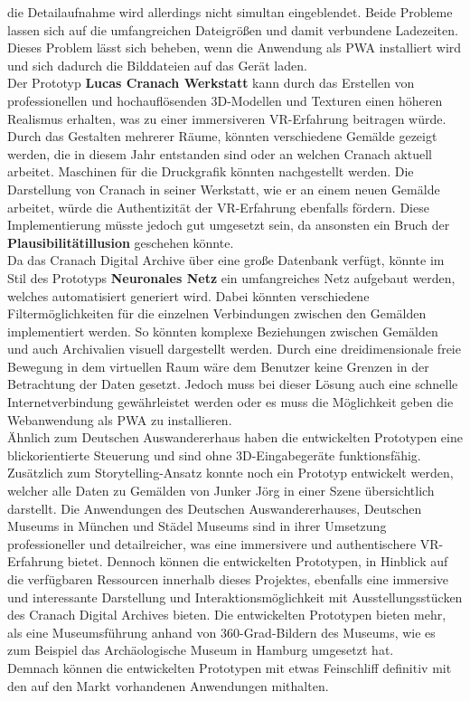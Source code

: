 \documentclass[a4paper,12pt,oneside]{article}
\begin{document}
    die Detailaufnahme wird allerdings nicht simultan eingeblendet.
    Beide Probleme lassen sich auf die umfangreichen Dateigrößen und damit
    verbundene Ladezeiten.
    Dieses Problem lässt sich beheben, wenn die Anwendung
    als PWA installiert wird und sich dadurch die Bilddateien auf das
    Gerät laden. \\
    Der Prototyp \textbf{Lucas Cranach Werkstatt} kann durch das Erstellen
    von professionellen und hochauflösenden 3D-Modellen und Texturen
    einen höheren Realismus erhalten, was zu einer immersiveren
    VR-Erfahrung beitragen würde. Durch das Gestalten mehrerer Räume,
    könnten verschiedene
    Gemälde gezeigt werden, die in diesem Jahr entstanden sind oder an
    welchen Cranach aktuell arbeitet. Maschinen für die Druckgrafik 
    könnten nachgestellt werden.
    Die Darstellung von Cranach in seiner Werkstatt, wie er an
    einem neuen Gemälde arbeitet, würde die Authentizität der VR-Erfahrung
    ebenfalls fördern. Diese Implementierung müsste jedoch gut umgesetzt sein,
    da ansonsten ein Bruch der \textbf{Plausibilitätillusion} geschehen könnte. \\
    Da das Cranach Digital Archive über eine große Datenbank verfügt,
    könnte im Stil des Prototyps \textbf{Neuronales Netz} ein 
    umfangreiches Netz aufgebaut werden, welches
    automatisiert generiert wird. Dabei könnten verschiedene 
    Filtermöglichkeiten für die einzelnen Verbindungen zwischen den 
    Gemälden implementiert werden. So könnten komplexe Beziehungen
    zwischen Gemälden und auch Archivalien visuell dargestellt werden.
    Durch eine dreidimensionale freie Bewegung in dem virtuellen Raum 
    wäre dem Benutzer keine Grenzen in der Betrachtung der Daten gesetzt.
    Jedoch muss bei dieser Lösung auch eine schnelle Internetverbindung
    gewährleistet werden oder es muss die Möglichkeit geben die Webanwendung
    als PWA zu installieren. \\
    Ähnlich zum Deutschen Auswandererhaus haben die entwickelten Prototypen 
    eine blickorientierte Steuerung und sind ohne 3D-Eingabegeräte funktionsfähig.
    Zusätzlich zum Storytelling-Ansatz konnte noch ein Prototyp entwickelt 
    werden, welcher alle Daten zu Gemälden von Junker Jörg in einer Szene 
    übersichtlich darstellt. Die Anwendungen des Deutschen Auswandererhauses,
    Deutschen Museums in München und Städel Museums sind in ihrer Umsetzung
    professioneller und detailreicher, was eine immersivere und authentischere
    VR-Erfahrung bietet. Dennoch können die entwickelten Prototypen, in Hinblick
    auf die verfügbaren Ressourcen innerhalb dieses Projektes, ebenfalls eine
    immersive und interessante Darstellung und Interaktionsmöglichkeit mit
    Ausstellungsstücken des Cranach Digital Archives bieten. Die entwickelten
    Prototypen bieten mehr, als eine Museumsführung anhand von 360-Grad-Bildern
    des Museums, wie es zum Beispiel das Archäologische Museum in Hamburg
    umgesetzt hat. \\ 
    Demnach können die entwickelten Prototypen mit etwas Feinschliff definitiv 
    mit den auf den Markt vorhandenen Anwendungen mithalten.
\end{document}
